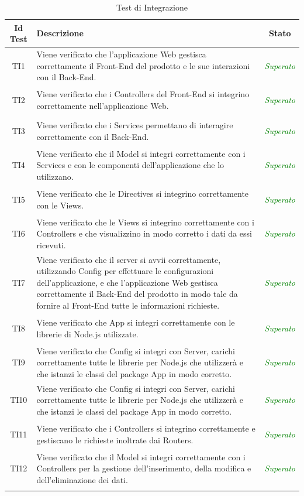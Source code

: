 \normalsize
\begin{longtable}[ht]{|c|>{}m{10cm}|c|}
\hline 
\textbf{Id Test} & \textbf{Descrizione} & \textbf{Stato}\\
\hline
\endhead
\hypertarget{TI1}{TI1} & Viene verificato che l’applicazione Web gestisca
correttamente il Front-End del prodotto e le sue interazioni
con il Back-End. & \textcolor{Green}{\textit{Superato}}\\ \hline
\hypertarget{TI2}{TI2} & Viene verificato che i Controllers del Front-End si integrino
correttamente nell’applicazione Web. & \textcolor{Green}{\textit{Superato}}\\ \hline
\hypertarget{TI3}{TI3} & Viene verificato che i Services permettano di interagire
correttamente con il Back-End. & \textcolor{Green}{\textit{Superato}}\\ \hline
\hypertarget{TI4}{TI4} & Viene verificato che il Model si integri correttamente con i
Services e con le componenti dell’applicazione che lo
utilizzano. & \textcolor{Green}{\textit{Superato}}\\ \hline
\hypertarget{TI5}{TI5} & Viene verificato che le Directives si integrino correttamente
con le Views. & \textcolor{Green}{\textit{Superato}}\\ \hline
\hypertarget{TI6}{TI6} & Viene verificato che le Views si integrino correttamente con i
Controllers e che visualizzino in modo corretto i dati da essi
ricevuti. & \textcolor{Green}{\textit{Superato}}\\ \hline
\hypertarget{TI7}{TI7} & Viene verificato che il server si avvii correttamente,
utilizzando Config per effettuare le configurazioni
dell’applicazione, e che l’applicazione Web gestisca
correttamente il Back-End del prodotto in modo tale da
fornire al Front-End tutte le informazioni richieste. & \textcolor{Green}{\textit{Superato}}\\ \hline
\hypertarget{TI8}{TI8} & Viene verificato che App si integri correttamente con le
librerie di Node.js utilizzate. & \textcolor{Green}{\textit{Superato}}\\ \hline
\hypertarget{TI9}{TI9} & Viene verificato che Config si integri con Server, carichi
correttamente tutte le librerie per Node.js che utilizzerà e
che istanzi le classi del package App in modo corretto. & \textcolor{Green}{\textit{Superato}}\\ \hline
\hypertarget{TI10}{TI10} & Viene verificato che Config si integri con Server, carichi
correttamente tutte le librerie per Node.js che utilizzerà e
che istanzi le classi del package App in modo corretto. & \textcolor{Green}{\textit{Superato}}\\ \hline
\hypertarget{TI11}{TI11} & Viene verificato che i Controllers si integrino correttamente
e gestiscano le richieste inoltrate dai Routers. & \textcolor{Green}{\textit{Superato}}\\ \hline
\hypertarget{TI12}{TI12} & Viene verificato che il Model si integri correttamente con i
Controllers per la gestione dell’inserimento, della modifica e
dell’eliminazione dei dati. & \textcolor{Green}{\textit{Superato}}\\ \hline
\caption[Test di Integrazione]{Test di Integrazione}
\label{tabella:test2}
\end{longtable}
\clearpage